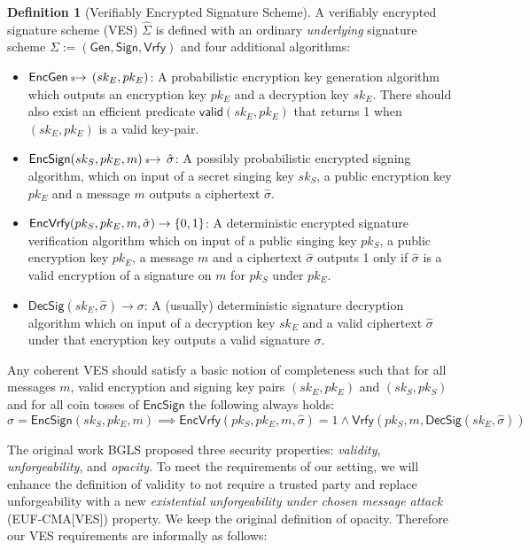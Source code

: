 \documentclass[fullpage]{article}
\theoremstyle{definition}
\newtheorem{definition}{Definition}[section]
\newcommand{\EUFCMAVES}{\textsf{EUF-CMA}[\textsf{VES}]\xspace}
\newcommand{\EncGen}{\textsf{EncGen}}
\newcommand{\EncSign}{\textsf{EncSign}}
\newcommand{\EncVer}{\textsf{EncVrfy}}
\newcommand{\DecSig}{\textsf{DecSig}}
\newcommand{\KeyGen}{\textsf{Gen}}
\newcommand{\Sign}{\textsf{Sign}}
\newcommand{\Verify}{\textsf{Vrfy}}
\newcommand{\SIGNALG}{\KeyGen, \Sign, \Verify}
\newcommand{\skSign}{sk_S}
\newcommand{\pkSign}{pk_S}
\newcommand{\kSign}{(\skSign,\pkSign)}
\newcommand{\skEnc}{sk_E}
\newcommand{\pkEnc}{pk_E}
\newcommand{\kEnc}{(\skEnc, \pkEnc)}
\newcommand{\hatsigma}{\hat{\sigma}}
\newcommand{\hatSigma}{\hat{\Sigma}}
\begin{document}
\begin{definition}[Verifiably Encrypted Signature Scheme]
\label{VES}
 A verifiably encrypted signature scheme (VES) $\hatSigma$ is defined with an ordinary \emph{underlying} signature scheme $\Sigma := (\SIGNALG)$ and four additional algorithms:
    \begin{itemize}
        \item $\EncGen \rightsample \kEnc$: A probabilistic encryption key generation algorithm which outputs an encryption key $\pkEnc$ and a decryption key $\skEnc$. There should also exist an efficient predicate $\textsf{valid}\kEnc$ that returns 1 when $\kEnc$ is a valid key-pair.
        \item $\EncSign(\skSign, \pkEnc, m) \rightsample \hatsigma$: A possibly probabilistic encrypted signing algorithm, which on input of a secret singing key $\skSign$, a public encryption key $\pkEnc$ and a message $m$ outputs a ciphertext $\hatsigma$.
        \item $\EncVer(\pkSign, \pkEnc, m, \hatsigma) \rightarrow \bin$: A deterministic encrypted signature verification algorithm which on input of a public singing key $\pkSign$, a public encryption key $\pkEnc$, a message $m$ and a ciphertext $\hatsigma$ outputs 1 only if $\hatsigma$ is a valid encryption of a signature on $m$ for $\pkSign$ under $\pkEnc$.
        \item $\DecSig(\skEnc, \hatsigma) \rightarrow \sigma$: A (usually) deterministic signature decryption algorithm which on input of a decryption key $\skEnc$ and a valid ciphertext $\hatsigma$ under that encryption key  outputs a valid signature $\sigma$.
    \end{itemize}

Any coherent VES should satisfy a basic notion of completeness such that for all messages $m$, valid encryption and signing key pairs $\kEnc$ and $\kSign$ and for all coin tosses of $\EncSign$ the following always holds:
    \[ \hatsigma = \EncSign(\skSign, \pkEnc, m) \implies \EncVer(\pkSign, \pkEnc, m, \hatsigma) = 1 \land \Verify(\pkSign, m, \DecSig(\skEnc, \hatsigma)) \]
\end{definition}

The original work BGLS proposed three security properties: \emph{validity}, \emph{unforgeability}, and \emph{opacity}. To meet the requirements of our setting, we will enhance the definition of validity to not require a trusted party and replace unforgeability with a new \emph{existential unforgeability under chosen message attack} (\EUFCMAVES) property. We keep the original definition of opacity. Therefore our VES requirements are informally as follows:
\end{document}
